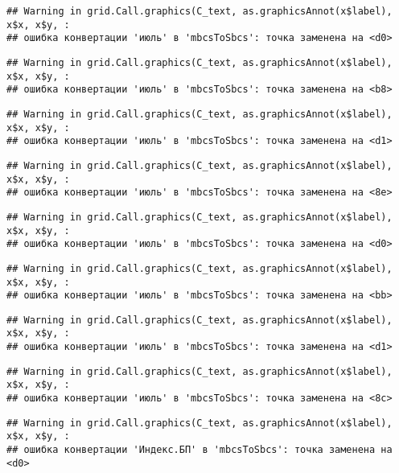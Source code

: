 \documentclass[
]{article}
\begin{document}
\begin{verbatim}
## Warning in grid.Call.graphics(C_text, as.graphicsAnnot(x$label), x$x, x$y, :
## ошибка конвертации 'июль' в 'mbcsToSbcs': точка заменена на <d0>
\end{verbatim}

\begin{verbatim}
## Warning in grid.Call.graphics(C_text, as.graphicsAnnot(x$label), x$x, x$y, :
## ошибка конвертации 'июль' в 'mbcsToSbcs': точка заменена на <b8>
\end{verbatim}

\begin{verbatim}
## Warning in grid.Call.graphics(C_text, as.graphicsAnnot(x$label), x$x, x$y, :
## ошибка конвертации 'июль' в 'mbcsToSbcs': точка заменена на <d1>
\end{verbatim}

\begin{verbatim}
## Warning in grid.Call.graphics(C_text, as.graphicsAnnot(x$label), x$x, x$y, :
## ошибка конвертации 'июль' в 'mbcsToSbcs': точка заменена на <8e>
\end{verbatim}

\begin{verbatim}
## Warning in grid.Call.graphics(C_text, as.graphicsAnnot(x$label), x$x, x$y, :
## ошибка конвертации 'июль' в 'mbcsToSbcs': точка заменена на <d0>
\end{verbatim}

\begin{verbatim}
## Warning in grid.Call.graphics(C_text, as.graphicsAnnot(x$label), x$x, x$y, :
## ошибка конвертации 'июль' в 'mbcsToSbcs': точка заменена на <bb>
\end{verbatim}

\begin{verbatim}
## Warning in grid.Call.graphics(C_text, as.graphicsAnnot(x$label), x$x, x$y, :
## ошибка конвертации 'июль' в 'mbcsToSbcs': точка заменена на <d1>
\end{verbatim}

\begin{verbatim}
## Warning in grid.Call.graphics(C_text, as.graphicsAnnot(x$label), x$x, x$y, :
## ошибка конвертации 'июль' в 'mbcsToSbcs': точка заменена на <8c>
\end{verbatim}

\begin{verbatim}
## Warning in grid.Call.graphics(C_text, as.graphicsAnnot(x$label), x$x, x$y, :
## ошибка конвертации 'Индекс.БП' в 'mbcsToSbcs': точка заменена на <d0>
\end{verbatim}
\end{document}
